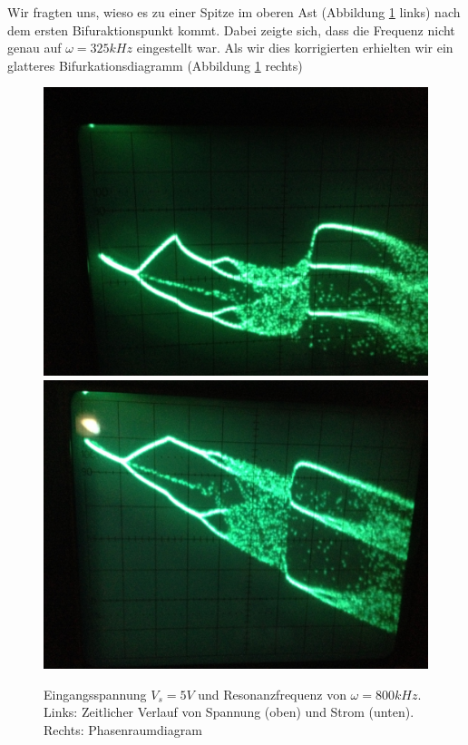 \documentclass{scrartcl}
\begin{document}
Wir fragten uns, wieso es zu einer Spitze im oberen Ast (Abbildung \ref{fig:ldr-bifurc} links) nach dem ersten Bifuraktionspunkt kommt. Dabei zeigte sich, dass die Frequenz nicht genau auf $\omega=325kHz$ eingestellt war. Als wir dies korrigierten erhielten wir ein glatteres Bifurkationsdiagramm (Abbildung \ref{fig:ldr-bifurc} rechts)

\begin{figure}[!htbp]
\centering
\includegraphics[scale=0.18]{bif-ldr/bifurc-bad}
\includegraphics[scale=0.18]{bif-ldr/bifurc-good}
\caption{Eingangsspannung $V_s=5V$ und Resonanzfrequenz von $\omega=800kHz$. Links: Zeitlicher Verlauf von Spannung (oben) und Strom (unten). Rechts: Phasenraumdiagram}
\label{fig:ldr-bifurc}
\end{figure}
\end{document}
